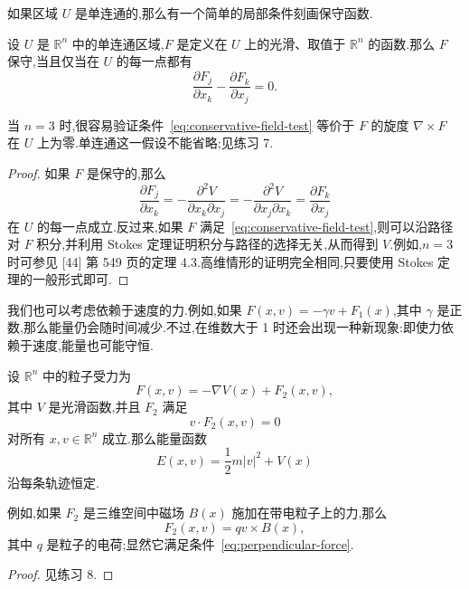 如果区域 $U$ 是单连通的,那么有一个简单的局部条件刻画保守函数.

\begin{proposition}[保守场的判定]\label{pro:conservative-field-test}
设 $U$ 是 $\mathbb{R}^{n}$ 中的单连通区域,$F$ 是定义在 $U$ 上的光滑、取值于 $\mathbb{R}^{n}$ 的函数.那么 $F$ 保守,当且仅当在 $U$ 的每一点都有
\begin{equation}
  \frac{\partial F_{j}}{\partial x_{k}}-\frac{\partial F_{k}}{\partial x_{j}}=0.
  \label{eq:conservative-field-test}
\end{equation}
\end{proposition}

当 $n=3$ 时,很容易验证条件~\eqref{eq:conservative-field-test} 等价于 $F$ 的旋度 $\nabla\times F$ 在 $U$ 上为零.单连通这一假设不能省略;见练习 7.

\begin{proof}
如果 $F$ 是保守的,那么
\[
  \frac{\partial F_{j}}{\partial x_{k}}
  =-\frac{\partial^{2}V}{\partial x_{k}\partial x_{j}}
  =-\frac{\partial^{2}V}{\partial x_{j}\partial x_{k}}
  =\frac{\partial F_{k}}{\partial x_{j}}
\]
在 $U$ 的每一点成立.反过来,如果 $F$ 满足~\eqref{eq:conservative-field-test},则可以沿路径对 $F$ 积分,并利用 Stokes 定理证明积分与路径的选择无关,从而得到 $V$.例如,$n=3$ 时可参见 [44] 第 549 页的定理 4.3.高维情形的证明完全相同,只要使用 Stokes 定理的一般形式即可.
\end{proof}

我们也可以考虑依赖于速度的力.例如,如果 $F(x,v)=-\gamma v+F_{1}(x)$,其中 $\gamma$ 是正数,那么能量仍会随时间减少.不过,在维数大于 1 时还会出现一种新现象:即使力依赖于速度,能量也可能守恒.

\begin{proposition}[垂直速度的力]\label{pro:velocity-perpendicular-force}
设 $\mathbb{R}^{n}$ 中的粒子受力为
\[
  F(x,v)=-\nabla V(x)+F_{2}(x,v),
\]
其中 $V$ 是光滑函数,并且 $F_{2}$ 满足
\begin{equation}
  v\cdot F_{2}(x,v)=0
  \label{eq:perpendicular-force}
\end{equation}
对所有 $x,v\in\mathbb{R}^{n}$ 成立.那么能量函数
\[
  E(x,v)=\frac12m\lvert v\rvert^{2}+V(x)
\]
沿每条轨迹恒定.
\end{proposition}

例如,如果 $F_{2}$ 是三维空间中磁场 $B(x)$ 施加在带电粒子上的力,那么
\[
  F_{2}(x,v)=qv\times B(x),
\]
其中 $q$ 是粒子的电荷;显然它满足条件~\eqref{eq:perpendicular-force}.

\begin{proof}
见练习 8.
\end{proof}


